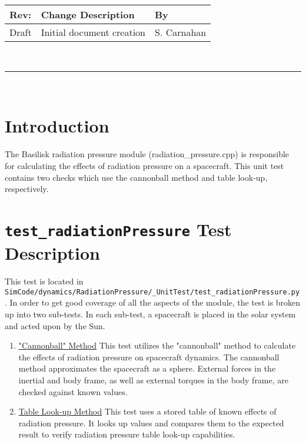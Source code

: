 \documentclass[]{BasiliskReportMemo}
\begin{document}
\makeCover


%
%
\pagestyle{empty}
{\renewcommand{\arraystretch}{1.1}
\noindent
\begin{longtable}{|p{0.5in}|p{4.5in}|p{1.14in}|}
\hline
{\bfseries Rev}: & {\bfseries Change Description} & {\bfseries By} \\
\hline
Draft & Initial document creation & S. Carnahan \\
\hline

\end{longtable}
}

\newpage
\setcounter{page}{1}
\pagestyle{fancy}

\tableofcontents
~\\ \hrule ~\\


\section{Introduction}
The Basilisk radiation pressure module (radiation\_pressure.cpp) is responsible for calculating the effects of radiation pressure on a spacecraft. This unit test contains two checks which use the cannonball method and table look-up, respectively.

\section{{\tt test\_radiationPressure} Test Description}

This test is located in {\tt SimCode/dynamics/RadiationPressure/\_UnitTest/test\_radiationPressure.py}. In order to get good coverage of all the aspects of the module, the test is broken up into two sub-tests. In each sub-test, a spacecraft is placed in the solar system and acted upon by the Sun. \par

\begin{enumerate}
	\item \underline{"Cannonball" Method} This test utilizes the "cannonball" method to calculate the effects of radiation pressure on spacecraft dynamics. The cannonball method approximates the spacecraft as a sphere. External forces in the inertial and body frame, as well as external torques in the body frame, are checked against known values.
	\item \underline{Table Look-up Method} This test uses a stored table of known effects of radiation pressure. It looks up values and compares them to the expected result to verify radiation pressure table look-up capabilities.
\end{enumerate} 
\end{document}

